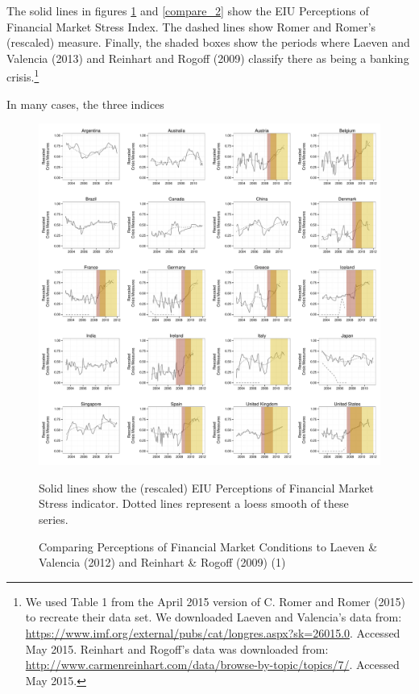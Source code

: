 \documentclass[]{article}
\let\rmarkdownfootnote\footnote%
\def\footnote{\protect\rmarkdownfootnote}
\begin{document}
The solid lines in figures \ref{compare_1} and \ref{compare_2} show the
EIU Perceptions of Financial Market Stress Index. The dashed lines show
Romer and Romer's (rescaled) measure. Finally, the shaded boxes show the
periods where Laeven and Valencia (2013) and Reinhart and Rogoff (2009)
classify there as being a banking crisis.\footnote{We used Table 1 from
  the April 2015 version of C. Romer and Romer (2015) to recreate their
  data set. We downloaded Laeven and Valencia's data from:
  \url{https://www.imf.org/external/pubs/cat/longres.aspx?sk=26015.0}.
  Accessed May 2015. Reinhart and Rogoff's data was downloaded from:
  \url{http://www.carmenreinhart.com/data/browse-by-topic/topics/7/}.
  Accessed May 2015.}

In many cases, the three indices

\begin{figure}
    \caption{Comparing Perceptions of Financial Market Conditions to Laeven \& Valencia (2012) and Reinhart \& Rogoff (2009) (1)}
    \label{compare_1}
    \begin{center}
        \includegraphics[scale=0.4]{analysis/figures/compare_to_lv_rr.pdf}
    \end{center}

    {\tiny{Solid lines show the (rescaled) EIU Perceptions of Financial Market Stress indicator. Dotted lines represent a loess smooth of these series. \\

}}
\end{figure}
\end{document}
